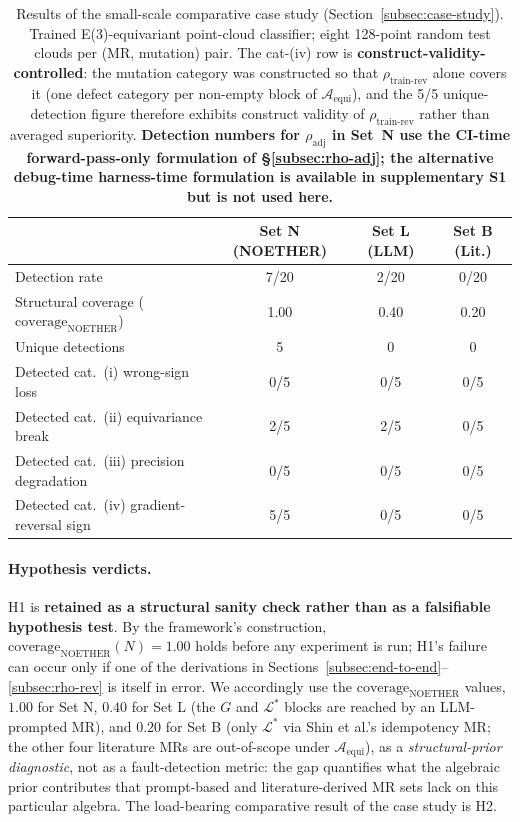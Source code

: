 \documentclass[acmsmall, screen]{acmart}
\begin{document}
\begin{table}[h]
\centering
\caption{Results of the small-scale comparative case study (Section~\ref{subsec:case-study}). Trained E(3)-equivariant point-cloud classifier; eight 128-point random test clouds per (MR, mutation) pair. The cat-(iv) row is \textbf{construct-validity-controlled}: the mutation category was constructed so that $\rho_{\mathrm{train\text{-}rev}}$ alone covers it (one defect category per non-empty block of $\mathcal{A}_{\mathrm{equi}}$), and the 5/5 unique-detection figure therefore exhibits construct validity of $\rho_{\mathrm{train\text{-}rev}}$ rather than averaged superiority. \textbf{Detection numbers for $\rho_{\mathrm{adj}}$ in Set~N use the CI-time forward-pass-only formulation of \S\ref{subsec:rho-adj}; the alternative debug-time harness-time formulation is available in supplementary S1 but is not used here.}}
\label{tab:case-study}
\small
\begin{tabular}{lccc}
\toprule
& Set N (NOETHER) & Set L (LLM) & Set B (Lit.) \\
\midrule
Detection rate & 7/20 & 2/20 & 0/20 \\
Structural coverage ($\mathrm{coverage}_{\mathrm{NOETHER}}$) & 1.00 & 0.40 & 0.20 \\
Unique detections & 5 & 0 & 0 \\
Detected cat.~(i) wrong-sign loss & 0/5 & 0/5 & 0/5 \\
Detected cat.~(ii) equivariance break & 2/5 & 2/5 & 0/5 \\
Detected cat.~(iii) precision degradation & 0/5 & 0/5 & 0/5 \\
Detected cat.~(iv) gradient-reversal sign & 5/5 & 0/5 & 0/5 \\
\bottomrule
\end{tabular}
\end{table}

\paragraph{Hypothesis verdicts.}
H1 is \textbf{retained as a structural sanity check rather than as a falsifiable hypothesis test}. By the framework's construction, $\mathrm{coverage}_{\mathrm{NOETHER}}(N) = 1.00$ holds before any experiment is run; H1's failure can occur only if one of the derivations in Sections~\ref{subsec:end-to-end}--\ref{subsec:rho-rev} is itself in error. We accordingly use the $\mathrm{coverage}_{\mathrm{NOETHER}}$ values, $1.00$ for Set N, $0.40$ for Set L (the $G$ and $\mathcal{L}^*$ blocks are reached by an LLM-prompted MR), and $0.20$ for Set B (only $\mathcal{L}^*$ via Shin et al.'s idempotency MR; the other four literature MRs are out-of-scope under $\mathcal{A}_{\mathrm{equi}}$), as a \emph{structural-prior diagnostic}, not as a fault-detection metric: the gap quantifies what the algebraic prior contributes that prompt-based and literature-derived MR sets lack on this particular algebra. The load-bearing comparative result of the case study is H2.
\end{document}
